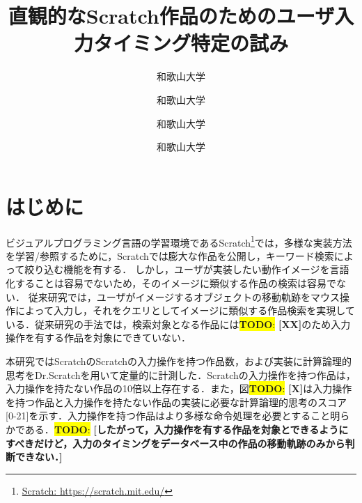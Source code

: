 \documentclass[uplatex,dvipdfmx,a4paper,twocolumn,base=11pt,jbase=11pt,ja=standard]{bxjsarticle}  %
\title{直観的なScratch作品のためのユーザ入力タイミング特定の試み}{Toward identifying user input timing for intuitive Scratch work search}
\author{和歌山大学}{岡本 圭悟}{Keigo Okamoto, Wakayama University}
\author{和歌山大学}{伊原 彰紀}{Akinori Ihara, Wakayama University}
\author{和歌山大学}{三倉 舞子}{Maiko Mikura, Wakayama University}
\author{和歌山大学}{橋谷 直樹}{Naoki Hashitani, Wakayama University}
\newcommand{\todo}[1]{\colorbox{yellow}{{\bf TODO}:}{\color{red} {\textbf{[#1]}}}}
\begin{document}
\maketitle


\section{はじめに}

%


ビジュアルプログラミング言語の学習環境であるScratch\footnote{\url{Scratch: https://scratch.mit.edu/}}では，多様な実装方法を学習/参照するために，Scratchでは膨大な作品を公開し，キーワード検索によって絞り込む機能を有する．
しかし，ユーザが実装したい動作イメージを言語化することは容易でないため，そのイメージに類似する作品の検索は容易でない．
従来研究\cite{thesis_fukuchi2021}では，ユーザがイメージするオブジェクトの移動軌跡をマウス操作によって入力し，それをクエリとしてイメージに類似する作品検索を実現している．従来研究の手法では，検索対象となる作品には\todo{XX}のため入力操作を有する作品を対象にできていない．

本研究ではScratchのScratchの入力操作を持つ作品数，および実装に計算論理的思考をDr.Scratchを用いて定量的に計測した．Scratchの入力操作を持つ作品は，入力操作を持たない作品の10倍以上存在する．また，図\todo{X}は入力操作を持つ作品と入力操作を持たない作品の実装に必要な計算論理的思考のスコア[0-21]を示す．入力操作を持つ作品はより多様な命令処理を必要とすること明らかである．\todo{したがって，入力操作を有する作品を対象とできるようにすべきだけど，入力のタイミングをデータベース中の作品の移動軌跡のみから判断できない．}

\end{document}

